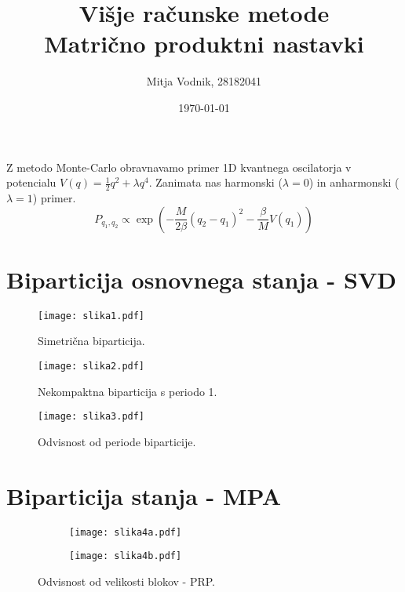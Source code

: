 \documentclass[a4paper]{article}
\newcommand{\half}{\frac{1}{2}}
\begin{document}
    \title{\sc\large Višje računske metode\\
		\bigskip
		\bf\Large Matrično produktni nastavki}
	\author{Mitja Vodnik, 28182041}
            \date{\today}
	\maketitle

    Z metodo Monte-Carlo obravnavamo primer 1D kvantnega oscilatorja v potencialu $V(q) = \half q^2 + \lambda q^4$.
    Zanimata nas harmonski ($\lambda = 0$) in anharmonski ($\lambda = 1$) primer. \\

    \begin{equation}\label{eq1}
        P_{q_1, q_2} \propto \exp \left( -\frac{M}{2\beta}(q_2 - q_1)^2 - \frac{\beta}{M}V(q_1) \right)
    \end{equation}

    \section{Biparticija osnovnega stanja - SVD} 

    \begin{figure}
        \centering
        \texttt{[image: slika1.pdf]}
        \caption{Simetrična biparticija.}
        \label{slika1}
    \end{figure}

    \begin{figure}
        \centering
        \texttt{[image: slika2.pdf]}
        \caption{Nekompaktna biparticija s periodo 1.}
        \label{slika2}
    \end{figure}

    \begin{figure}
        \centering
        \texttt{[image: slika3.pdf]}
        \caption{Odvisnost od periode biparticije.}
        \label{slika3}
    \end{figure}

    \section{Biparticija stanja - MPA}

    \begin{figure}
        \centering
        \begin{subfigure}{\textwidth}
            \texttt{[image: slika4a.pdf]}
        \end{subfigure}
        \begin{subfigure}{\textwidth}
            \texttt{[image: slika4b.pdf]}
        \end{subfigure}
        \caption{Odvisnost od velikosti blokov - PRP.}
        \label{slika4}
    \end{figure}
\end{document}
